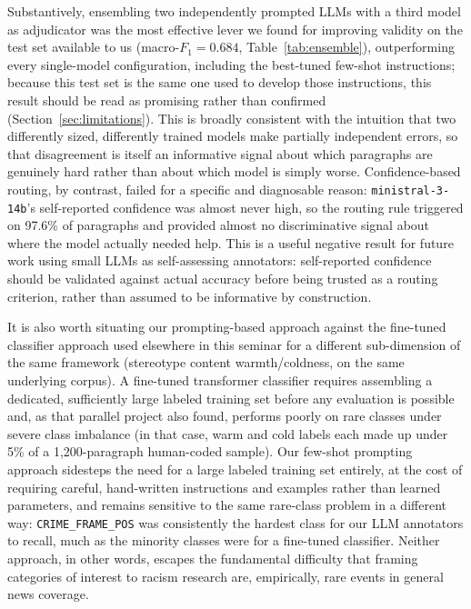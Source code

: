 \documentclass[a4paper,oneside,bibliography=totoc]{scrartcl}
\begin{document}
Substantively, ensembling two independently prompted LLMs with a third model as adjudicator was the most effective lever we found for improving validity on the test set available to us (macro-$F_1 = 0.684$, Table~\ref{tab:ensemble}), outperforming every single-model configuration, including the best-tuned few-shot instructions; because this test set is the same one used to develop those instructions, this result should be read as promising rather than confirmed (Section~\ref{sec:limitations}). This is broadly consistent with the intuition that two differently sized, differently trained models make partially independent errors, so that disagreement is itself an informative signal about which paragraphs are genuinely hard rather than about which model is simply worse. Confidence-based routing, by contrast, failed for a specific and diagnosable reason: \texttt{ministral-3-14b}'s self-reported confidence was almost never high, so the routing rule triggered on 97.6\% of paragraphs and provided almost no discriminative signal about where the model actually needed help. This is a useful negative result for future work using small LLMs as self-assessing annotators: self-reported confidence should be validated against actual accuracy before being trusted as a routing criterion, rather than assumed to be informative by construction.

It is also worth situating our prompting-based approach against the fine-tuned classifier approach used elsewhere in this seminar for a different sub-dimension of the same framework (stereotype content warmth/coldness, on the same underlying corpus). A fine-tuned transformer classifier requires assembling a dedicated, sufficiently large labeled training set before any evaluation is possible and, as that parallel project also found, performs poorly on rare classes under severe class imbalance (in that case, warm and cold labels each made up under 5\% of a 1{,}200-paragraph human-coded sample). Our few-shot prompting approach sidesteps the need for a large labeled training set entirely, at the cost of requiring careful, hand-written instructions and examples rather than learned parameters, and remains sensitive to the same rare-class problem in a different way: \texttt{CRIME\_FRAME\_POS} was consistently the hardest class for our LLM annotators to recall, much as the minority classes were for a fine-tuned classifier. Neither approach, in other words, escapes the fundamental difficulty that framing categories of interest to racism research are, empirically, rare events in general news coverage.
\end{document}
